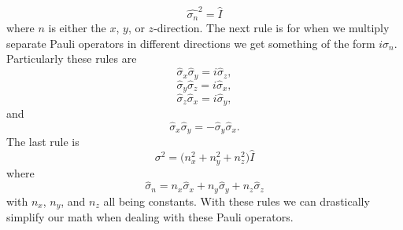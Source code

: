 \documentclass[twocolumn]{article}
\begin{document}
\begin{equation}\label{Eq: POI}
\hat{\sigma_n}^2=\hat{I}
\end{equation}
where $n$ is either the $x$, $y$, or $z$-direction. The next rule is for when we multiply separate Pauli operators in different directions we get something of the form $i\sigma_n$. Particularly these rules are
\begin{equation}\label{Eq: POXY}
\hat{\sigma}_x\hat{\sigma}_y=i\hat{\sigma}_z,
\end{equation}
\begin{equation}\label{Eq: POYZ}
\hat{\sigma}_y\hat{\sigma}_z=i\hat{\sigma}_x,
\end{equation}
\begin{equation}\label{Eq: POZX}
\hat{\sigma}_z\hat{\sigma}_x=i\hat{\sigma}_y,
\end{equation}
and
\begin{equation}\label{Eq: PO-XY}
\hat{\sigma}_x\hat{\sigma}_y=-\hat{\sigma}_y\hat{\sigma}_x.
\end{equation}
The last rule is
\begin{equation}\label{Eq: POS}
\sigma^2=\big(n_x^2+n_y^2+n_z^2\big)\hat{I}
\end{equation}
where
\begin{equation}\label{Eq: PON}
\hat{\sigma}_n=n_x\hat{\sigma}_x+n_y\hat{\sigma}_y+n_z\hat{\sigma}_z
\end{equation}
with $n_x$, $n_y$, and $n_z$ all being constants. With these rules we can drastically simplify our math when dealing with these Pauli operators.
\end{document}
